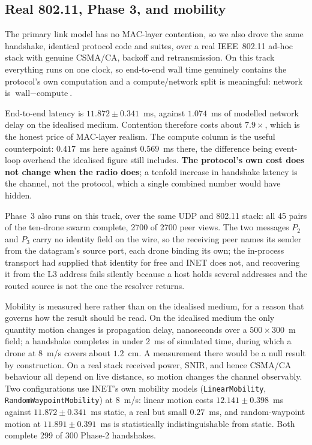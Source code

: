 \documentclass[conference]{IEEEtran}
\begin{document}
\subsection{Real 802.11, Phase 3, and mobility}
\label{sec:inet}

The primary link model has no MAC-layer contention, so we also drove the same
handshake, identical protocol code and suites, over a real IEEE~802.11 ad-hoc
stack with genuine CSMA/CA, backoff and retransmission. On this track everything
runs on one clock, so end-to-end wall time genuinely contains the protocol's own
computation and a compute/network split is meaningful: network is
$\text{wall} - \text{compute}$.

End-to-end latency is $11.872 \pm 0.341$~ms, against $1.074$~ms of modelled
network delay on the idealised medium. Contention therefore costs about
$7.9\times$, which is the honest price of MAC-layer realism. The compute column
is the useful counterpoint: $0.417$~ms here against $0.569$~ms there, the
difference being event-loop overhead the idealised figure still includes.
\textbf{The protocol's own cost does not change when the radio does}; a tenfold
increase in handshake latency is the channel, not the protocol, which a single
combined number would have hidden.

Phase~3 also runs on this track, over the same UDP and 802.11 stack: all 45
pairs of the ten-drone swarm complete, 2700 of 2700 peer views. The two messages
$P_2$ and $P_3$ carry no identity field on the wire, so the receiving peer names
its sender from the datagram's source port, each drone binding its own; the
in-process transport had supplied that identity for free and INET does not, and
recovering it from the L3 address fails silently because a host holds several
addresses and the routed source is not the one the resolver returns.

Mobility is measured here rather than on the idealised medium, for a reason that
governs how the result should be read. On the idealised medium the only quantity
motion changes is propagation delay, nanoseconds over a $500 \times 300$~m
field; a handshake completes in under 2~ms of simulated time, during which a
drone at 8~m/s covers about $1.2$~cm. A measurement there would be a null result
by construction. On a real stack received power, SNIR, and hence CSMA/CA
behaviour all depend on live distance, so motion changes the channel
observably. Two configurations use INET's own mobility models
(\texttt{LinearMobility}, \texttt{RandomWaypointMobility}) at 8~m/s: linear
motion costs $12.141 \pm 0.398$~ms against $11.872 \pm 0.341$~ms static, a real
but small $0.27$~ms, and random-waypoint motion at $11.891 \pm 0.391$~ms is
statistically indistinguishable from static. Both complete 299 of 300 Phase-2
handshakes.
\end{document}
